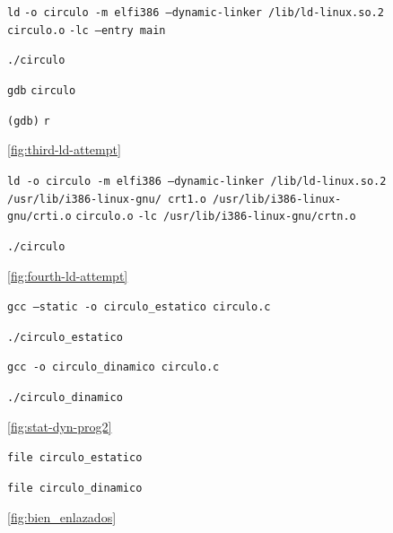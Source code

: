 \documentclass[11pt]{article}
\newcommand{\codetext}[2]{\large\texttt{\textcolor{#1}{#2}}}
\newcommand{\imagecaption}[1]{\vspace{-7pt}\caption*{\char91\ref{fig:#1}\char93}}
\begin{document}
		\begin{figure}[H]
			\centering
			\begin{code-box}
				\codetext{light-blue}{ld} \codetext{orange-desert-vim}{-o circulo -m elf\textunderscore\/i386 --dynamic-linker /lib/ld-linux.so.2} \codetext{light-red}{circulo.o} \codetext{orange-desert-vim}{-lc --entry main}
				
				\codetext{light-blue}{./circulo}
				
				\codetext{light-blue}{gdb} \codetext{light-red}{circulo}
				
				\codetext{light-green}{(gdb)} \codetext{light-blue}{r}
			\end{code-box}
			\imagecaption{third-ld-attempt}
		\end{figure}
		
		\begin{figure}[H]
			\centering
			\begin{code-box}
				\codetext{light-blue}{ld }\codetext{orange-desert-vim}{-o circulo -m elf\textunderscore\/i386 --dynamic-linker /lib/ld-linux.so.2 /usr/lib/i386-linux-gnu/ crt1.o /usr/lib/i386-linux-gnu/crti.o} \codetext{light-red}{circulo.o} \codetext{orange-desert-vim}{-lc /usr/lib/i386-linux-gnu/crtn.o}
				
				\codetext{light-blue}{./circulo}
			\end{code-box}
			\imagecaption{fourth-ld-attempt}
		\end{figure}
	
		
		\begin{figure}[H]
			\centering
			\begin{code-box}
				\codetext{light-blue}{gcc }\codetext{orange-desert-vim}{--static -o circulo\_estatico }\codetext{light-red}{circulo.c}
				
				\codetext{light-blue}{./circulo\_estatico}\newline
				
				\codetext{light-blue}{gcc }\codetext{orange-desert-vim}{-o circulo\_dinamico }\codetext{light-red}{circulo.c}
				
				\codetext{light-blue}{./circulo\_dinamico}
			\end{code-box}
			\imagecaption{stat-dyn-prog2}
		\end{figure}
		
		\begin{figure}[H]
			\centering
			\begin{code-box}
				\codetext{light-blue}{file }\codetext{light-red}{circulo\_estatico}
				
				\codetext{light-blue}{file }\codetext{light-red}{circulo\_dinamico}
				
			\end{code-box}
			\imagecaption{bien_enlazados}
		\end{figure}
		
\end{document}

